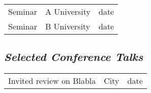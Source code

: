 \documentclass[STG]{ercgrant}
\begin{document}
\color{red}
\begin{longtable}{p{7.5cm}p{6cm}l}
	Seminar & A University & date \\
	Seminar & B University & date \\
\end{longtable}
\color{black}

\subsection{\textit{Selected Conference Talks}}

\color{red}
\begin{longtable}{p{7.5cm}p{6cm}l}
	Invited review on Blabla & City & date \\
\end{longtable}
\color{black}
\end{document}
